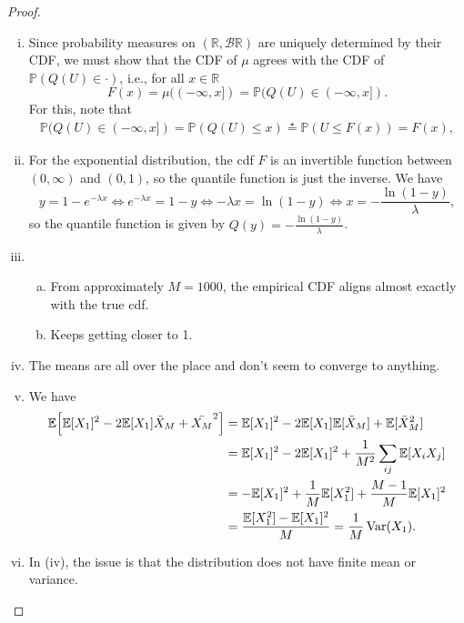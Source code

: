 \documentclass{article}
\theoremstyle{plain}
\theoremstyle{remark}
\newcommand{\Bb}{\mathbb}
\newcommand{\Cal}{\mathcal}
\newcommand{\PP}{\Bb P}
\newcommand{\RR}{\Bb R}
\newcommand{\EE}{\Bb E}
\DeclareMathOperator{\Var}{Var}
\newcommand\BB{\Cal B}
\begin{document}
\begin{proof}
	\begin{enumerate}[(i)]
		\item Since probability measures on $(\RR, \BB\RR)$ are uniquely determined by their CDF, we must show that the CDF of $\mu$ agrees with the CDF of $\PP(Q(U) \in \cdot)$, i.e., for all $x \in \RR$
		\[
		F(x) = \mu((-\infty, x]) = \PP(Q(U) \in (-\infty, x]). 
		\]
		For this, note that
		\begin{align*}
			\PP(Q(U) \in (-\infty, x]) = \PP(Q(U) \leq x) \overset\star= \PP(U \leq F(x)) = F(x), 
		\end{align*}
	
	\item For the exponential distribution, the cdf $F$ is an invertible function between $(0, \infty)$ and $(0, 1)$, so the quantile function is just the inverse. We have
	\[	
	y = 1 - e^{-\lambda x} \iff e^{-\lambda x} = 1 - y \iff -\lambda x = \ln(1 - y) \iff x = -\frac{\ln(1 - y)}{\lambda}, 
	\]
	so the quantile function is given by $Q(y) = -\frac{\ln(1 - y)}{\lambda}$. 
	
	\item
	
	\begin{enumerate}[(a)]
		\item From approximately $M = 1000$, the empirical CDF aligns almost exactly with the true cdf.
		\item Keeps getting closer to 1. 
	\end{enumerate}

\item The means are all over the place and don't seem to converge to anything.

\item We have 
\begin{align*}
	\EE\qty[\EE[X_1]^2 - 2\EE[X_1] \bar X_M + \bar{X_M}^2] &= \EE[X_1]^2 - 2\EE[X_1] \EE[\bar X_M] + \EE[\bar X_M^2] \\
	&= \EE[X_1]^2 - 2\EE[X_1]^2 + \frac1{M^2} \sum_{ij} \EE[X_i X_j] \\
	&= - \EE[X_1]^2 + \frac1M \EE[X_1^2] + \frac{M-1}{M} \EE[X_1]^2 \\
	&= \frac{\EE[X_1^2] - \EE[X_1]^2}{M} = \frac1M \Var(X_1).  
\end{align*}

\item In (iv), the issue is that the distribution does not have finite mean or variance. 
	\end{enumerate}

\end{proof}
\end{document}
